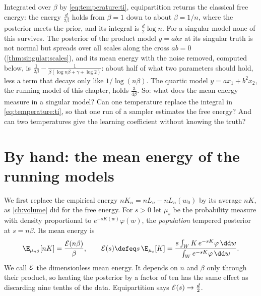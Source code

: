\begin{refsection}
Integrated over $\beta$ by \eqref{eq:temperature:ti}, equipartition returns the classical free energy: the energy $\frac d{2\beta}$ holds from $\beta=1$ down to about $\beta=1/n$, where the posterior meets the prior, and its integral is $\frac d2\log n$. For a singular model none of this survives. The posterior of the product model $y=abx$ at its singular truth is not normal but spreads over all scales along the cross $ab=0$ (\cref{thm:singular:scales}), and its mean energy with the noise removed, computed below, is $\frac1{2\beta}-\frac1{\beta(\log n\beta+\gamma+\log2)}$: about half of what two parameters should hold, less a term that decays only like $1/\log(n\beta)$. The quartic model $y=ax_1+b^2x_2$, the running model of this chapter, holds $\frac3{4\beta}$. So: what does the mean energy measure in a singular model? Can one temperature replace the integral in \eqref{eq:temperature:ti}, so that one run of a sampler estimates the free energy? And can two temperatures give the learning coefficient without knowing the truth?

\section{By hand: the mean energy of the running models}\label{sec:temperature:byhand}

We first replace the empirical energy $nK_n=nL_n-nL_n(w_0)$ by its average $nK$, as \cref{ch:volume} did for the free energy. For $s>0$ let $\mu_s$ be the probability measure with density proportional to $e^{-sK(w)}\varphi(w)$, the \emph{population} tempered posterior at $s=n\beta$. Its mean energy is
\begin{equation}\label{eq:temperature:dimless}
\E_{\mu_{n\beta}}[nK]=\frac{\temperatureE(n\beta)}{\beta},\qquad
\temperatureE(s)\defeq s\,\E_{\mu_s}[K]=\frac{s\int_WK\,e^{-sK}\varphi\,\dd w}{\int_We^{-sK}\varphi\,\dd w}.
\end{equation}
We call $\mathcal{E}$ the dimensionless mean energy. It depends on $n$ and $\beta$ only through their product, so heating the posterior by a factor of ten has the same effect as discarding nine tenths of the data. Equipartition says $\mathcal{E}(s)\to\frac d2$.


\end{refsection}
